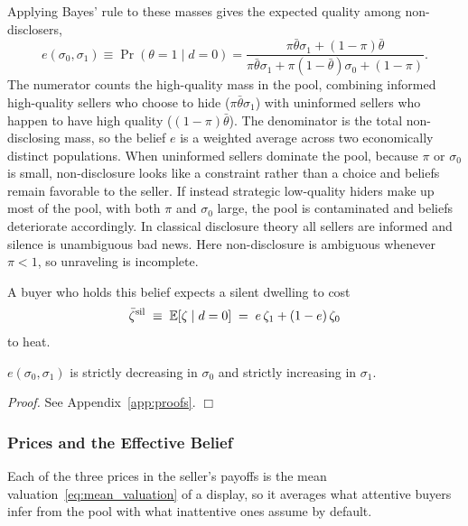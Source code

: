 Applying Bayes' rule to these masses gives the expected quality among non-disclosers,
\begin{equation}
    e(\sigma_0, \sigma_1) \equiv \Pr(\theta=1 \mid d=0) = \frac{\pi \bar{\theta} \sigma_1 + (1-\pi) \bar{\theta}}{\pi \bar{\theta} \sigma_1 + \pi (1-\bar{\theta}) \sigma_0 + (1-\pi)}.
    \label{eq:belief_general}
\end{equation}
The numerator counts the high-quality mass in the pool, combining informed high-quality sellers who choose to hide ($\pi\bar{\theta}\sigma_1$) with uninformed sellers who happen to have high quality ($(1-\pi)\bar{\theta}$). The denominator is the total non-disclosing mass, so the belief $e$ is a weighted average across two economically distinct populations. When uninformed sellers dominate the pool, because $\pi$ or $\sigma_0$ is small, non-disclosure looks like a constraint rather than a choice and beliefs remain favorable to the seller. If instead strategic low-quality hiders make up most of the pool, with both $\pi$ and $\sigma_0$ large, the pool is contaminated and beliefs deteriorate accordingly. In classical disclosure theory all sellers are informed and silence is unambiguous bad news. Here non-disclosure is ambiguous whenever $\pi < 1$, so unraveling is incomplete.

A buyer who holds this belief expects a silent dwelling to cost
\begin{equation}
    \bar \zeta^{\rm sil}\;\equiv\;\mathbb E[\zeta\mid d=0]\;=\;e\,\zeta_1+(1-e)\,\zeta_0
    \label{eq:csil}
\end{equation}
to heat.

\begin{lemma}\label{lem:belief_monotone}
$e(\sigma_0,\sigma_1)$ is strictly decreasing in $\sigma_0$ and strictly increasing in $\sigma_1$.
\end{lemma}

\noindent\textit{Proof.} See Appendix~\ref{app:proofs}. $\Box$

\subsubsection{Prices and the Effective Belief}
\label{ss:att_prices}

Each of the three prices in the seller's payoffs is the mean valuation~\eqref{eq:mean_valuation} of a display, so it averages what attentive buyers infer from the pool with what inattentive ones assume by default.

